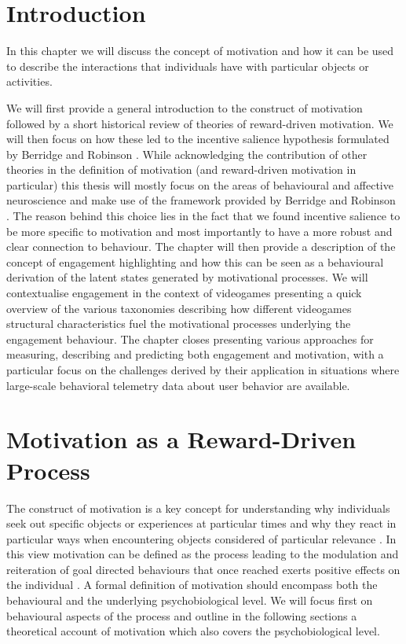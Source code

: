 \section{Introduction}
\label{motivation_engagement_introduction}
In this chapter we will discuss the concept of motivation and how it can be used to describe the interactions that individuals have with particular objects or activities. 

We will first provide a general introduction to the construct of motivation followed by a short historical review of theories of reward-driven motivation. We will then focus on how these led to the incentive salience hypothesis formulated by Berridge and Robinson \cite{berridge1998role}. While acknowledging the contribution of other theories in the definition of motivation (and reward-driven motivation in particular) this thesis will mostly focus on the areas of behavioural and affective neuroscience and make use of the framework provided by Berridge and Robinson \cite{berridge1998role}. The reason behind this choice lies in the fact that we found incentive salience to be more specific to motivation and most importantly to have a more robust and clear connection to behaviour. The chapter will then provide a description of the concept of engagement highlighting and how this can be seen as a behavioural derivation of the latent states generated by motivational processes. We will contextualise engagement in the context of videogames presenting a quick overview of the various taxonomies describing how different videogames structural characteristics fuel the motivational processes underlying the engagement behaviour. The chapter closes presenting various approaches for measuring, describing and predicting both engagement and motivation, with a particular focus on the challenges derived by their application in situations where large-scale behavioral telemetry data about user behavior are available.

\section{Motivation as a Reward-Driven Process}
\label{motivation}
The construct of motivation is a key concept for understanding why individuals seek out specific objects or experiences at particular times and why they react in particular ways when encountering objects considered of particular relevance \cite{berridge2004motivation}. In this view motivation can be defined as the process leading to the modulation and reiteration of goal directed behaviours that once reached exerts positive effects on the individual \cite{simpson2016behavioral}. A formal definition of motivation should encompass both the behavioural and the underlying psychobiological level. We will focus first on behavioural aspects of the process and outline in the following sections a theoretical account of motivation which also covers the psychobiological level. 

